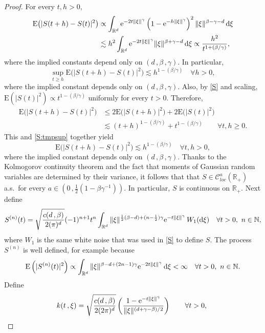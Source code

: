 \documentclass[reqno]{amsart}
\newcommand{\<}{\langle}
\renewcommand{\>}{\rangle}
\newcommand{\N}{\mathbb{N}}
\newcommand{\R}{\mathbb{R}}
\newcommand{\cC}{\mathcal{C}}
\newcommand{\E}{\mathrm{E}}
\newcommand{\1}{\mathbb{1}}
\renewcommand{\d}{{\rm d}}
\newcommand{\e}{{\rm e}}
\renewcommand{\ge}{\geqslant}
\renewcommand{\le}{\leqslant}
\theoremstyle{definition}
\numberwithin{equation}{section}
\begin{document}
\begin{proof}
	For every $t,h>0$,
	\begin{align*}
		\E\big( |S(t+h)-S(t)|^2\big) 
			&\propto \int_{\R^d} \e^{-2t\|\xi\|^\gamma}
			\left( 1 - \e^{-h\|\xi\|^\gamma} \right)^2 \|\xi\|^{\beta-\gamma-d}\, \d \xi\\
		&\lesssim h^2 \int_{\R^d}  \e^{-2t\|\xi\|^\gamma} \|\xi\|^{\beta+\gamma-d}\, \d \xi
			\propto \frac{h^2}{t^{1+(\beta/\gamma)}},
	\end{align*}
	where the implied constants depend only on $(d\,,\beta\,,\gamma)$.
	In particular, 
	\begin{equation}\label{S:tmpsup}
		\sup_{t\ge h}\E\big( |S(t+h)-S(t)|^2\big) \lesssim h^{1-(\beta/\gamma)}\quad
		\forall h>0,
	\end{equation}
	where the implied constant depends only on $(d\,,\beta\,,\gamma)$.
	Also, by \eqref{S} and scaling, $\E( |S(t)|^2)\propto t^{1-(\beta/\gamma)}$
	uniformly for every $t>0$. Therefore,
	\begin{align*}
		\E\big( |S(t+h)-S(t)|^2\big) &\le 2\E\big(|S(t+h)|^2\big)+2\E\big(|S(t)|^2\big)\\
		&\lesssim (t+h)^{1-(\beta/\gamma)}+ t^{1-(\beta/\gamma)}
			\qquad\forall t,h\ge0.
	\end{align*}
	This and \eqref{S:tmpsup} together yield
	\[
		\E\big( |S(t+h)-S(t)|^2\big) \lesssim h^{1-(\beta/\gamma)}
		\quad\forall t,h>0,
	\]
	where the implied constant depends only on $(d\,,\beta\,,\gamma)$. Thanks to the Kolmogorov
	continuity theorem and the fact that moments of Gaussian random variables
	are determined by their variance, it follows that that $S\in\cC^a_{\textit{loc}}(\R_+)$
	a.s.\ for every $a\in(0\,, \frac12(1-\beta\gamma^{-1}))$. In particular, $S$
	is continuous on $\R_+$. Next define
	\[
		S^{(n)}(t)
		= \sqrt{\frac{c(d\,,\beta)}{2(\pi)^d}}(-1)^{n+1} t^n \int_{\R^d} 
		\|\xi\|^{\frac12(\beta-d)+(n-\frac12)\gamma}\e^{-t\|\xi\|^\gamma}
		\,W_1(\d\xi) \quad\forall t > 0,\ n\in\N,
	\]
	where $W_1$ is the same 
	white noise that was used in \eqref{S} to define $S$. The process $S^{(n)}$ is well defined,
	for example because
	\begin{align*}
		\E\left(|S^{(n)}(t)|^2\right) \propto \int_{\R^d} 
		\|\xi\|^{\beta-d+(2n-1)\gamma} \e^{-2t\|\xi\|^\gamma}\,\d\xi
		<\infty\quad\forall t > 0,\ n\in\N.
	\end{align*}
	Define
	\[
		k(t\,,\xi) = 
		\sqrt{\frac{c(d\,,\beta)}{2(2\pi)^d}} \left(\frac{ 1 - \e^{-t\|\xi\|^\gamma}}{%
		\|\xi\|^{(d+\gamma-\beta)/2}}\right)\qquad\forall t>0,\
\]
\end{proof}
\end{document}
